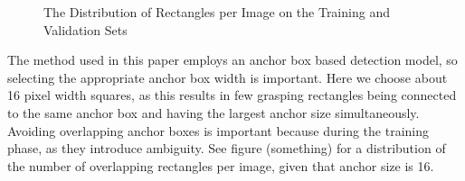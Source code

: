 \documentclass{article}
\begin{document}
\begin{figure}
\centering
{}
\qquad
{}
\caption{The Distribution of Rectangles per Image on the Training and Validation Sets}
\label{fig:recdist}
\end{figure}


The method used in this paper employs an anchor box
based detection model, so selecting the appropriate anchor box width is important.
Here we choose about 16 pixel width squares, as this results in few grasping
rectangles being connected to the same anchor box and having the largest anchor
size simultaneously. Avoiding overlapping anchor boxes is important because
during the training phase, as they introduce ambiguity.
See figure (something) for a distribution of the number
of overlapping rectangles per image, given that anchor size is 16.
\end{document}
